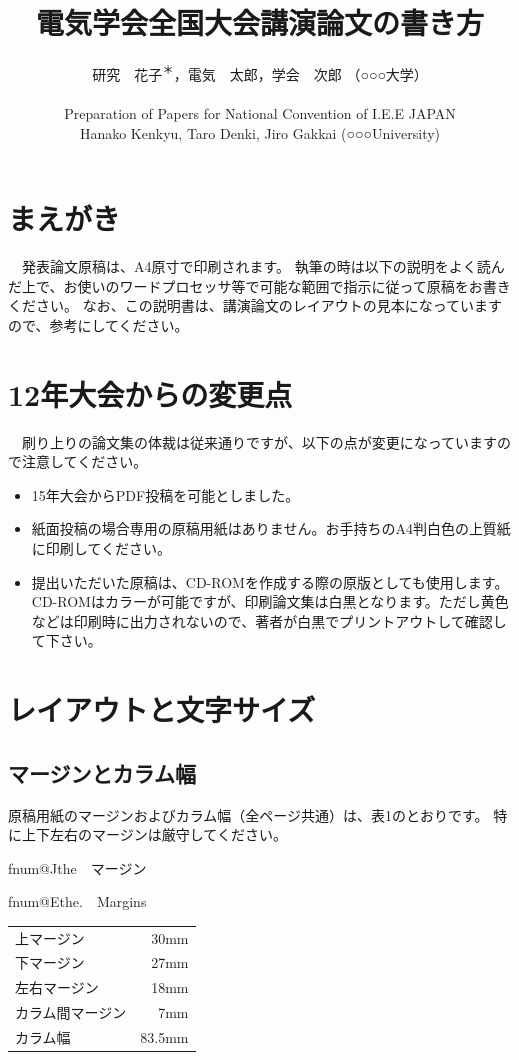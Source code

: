 \documentclass[uplatex,dvipdfmx,ja=standard,twocolumn]{bxjsarticle}
\title{\fontsize{19.5pt}{25pt}\selectfont 電気学会全国大会講演論文の書き方\vspace{8pt}}
\author{\fontsize{13pt}{14pt}\selectfont 研究　花子\textsuperscript{\!＊}，電気　太郎，学会　次郎 （○○○大学）\\
\fontsize{9pt}{14pt}\selectfont \\
\fontsize{9pt}{14pt}\selectfont Preparation of Papers for National Convention of I.E.E JAPAN\\
\fontsize{9pt}{14pt}\selectfont Hanako Kenkyu, Taro Denki, Jiro Gakkai (○○○University)}
\date{\vspace{-19pt}}
\makeatletter
\newcommand{\ieejcaption}[2]{%
\stepcounter{\@captype}
\par
\fontsize{8pt}{0pt}\selectfont
\csname fnum@J\@captype\endcsname \csname the\@captype\endcsname　#1\par
\csname fnum@E\@captype\endcsname \csname the\@captype\endcsname.　#2\par
}
\makeatother
\begin{document}
\maketitle

\fontsize{9.8pt}{14pt}\selectfont

\section{まえがき}

　発表論文原稿は、A4原寸で印刷されます。
執筆の時は以下の説明をよく読んだ上で、お使いのワードプロセッサ等で可能な範囲で指示に従って原稿をお書きください。
なお、この説明書は、講演論文のレイアウトの見本になっていますので、参考にしてください。

\section{12年大会からの変更点}

　刷り上りの論文集の体裁は従来通りですが、以下の点が変更になっていますので注意してください。
\begin{itemize}
  \item 15年大会からPDF投稿を可能としました。
  \item 紙面投稿の場合専用の原稿用紙はありません。お手持ちのA4判白色の上質紙に印刷してください。
  \item 提出いただいた原稿は、CD-ROMを作成する際の原版としても使用します。CD-ROMはカラーが可能ですが、印刷論文集は白黒となります。ただし黄色などは印刷時に出力されないので、著者が白黒でプリントアウトして確認して下さい。
\end{itemize}

\section{レイアウトと文字サイズ}

\subsection{マージンとカラム幅}

原稿用紙のマージンおよびカラム幅（全ページ共通）は、表1のとおりです。
特に上下左右のマージンは厳守してください。

\vspace{-5pt}

\begin{table}[h]
  \centering
  \ieejcaption{マージン}{Margins}
  \fontsize{8pt}{12pt}\selectfont
  \begin{tabular}{lr}
    \hline
    上マージン       & 30mm\\
    下マージン       & 27mm\\
    左右マージン     & 18mm\\
    カラム間マージン &  7mm\\
    カラム幅         & 83.5mm\\
    \hline
  \end{tabular}
\end{table}
\end{document}
